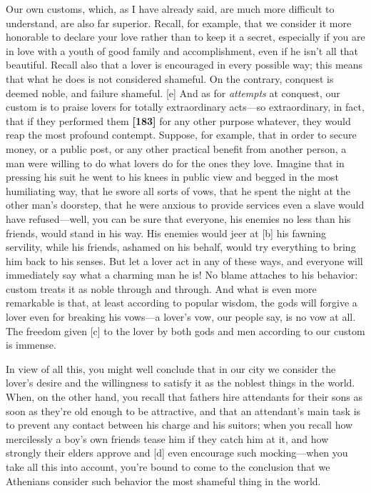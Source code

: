 Our own customs, which, as I have already said, are much more difficult
to understand, are also far superior. Recall, for example, that we
consider it more honorable to declare your love rather than to keep it a
secret, especially if you are in love with a youth of good family and
accomplishment, even if he isn't all that beautiful. Recall also that a
lover is encouraged in every possible way; this means that what he does
is not considered shameful. On the contrary, conquest is deemed noble,
and failure shameful. {[}e{]} And as for {\em attempts} at conquest, our
custom is to praise lovers for totally extraordinary acts---so
extraordinary, in fact, that if they performed them {\bf {[}183{]}} for
any other purpose whatever, they would reap the most profound contempt.
Suppose, for example, that in order to secure money, or a public post,
or any other practical benefit from another person, a man were willing
to do what lovers do for the ones they love. Imagine that in pressing
his suit he went to his knees in public view and begged in the most
humiliating way, that he swore all sorts of vows, that he spent the
night at the other man's doorstep, that he were anxious to provide
services even a slave would have refused---well, you can be sure that
everyone, his enemies no less than his friends, would stand in his way.
His enemies would jeer at {[}b{]} his fawning servility, while his
friends, ashamed on his behalf, would try everything to bring him back
to his senses. But let a lover act in any of these ways, and everyone
will immediately say what a charming man he is! No blame attaches to his
behavior: custom treats it as noble through and through. And what is
even more remarkable is that, at least according to popular wisdom, the
gods will forgive a lover even for breaking his vows---a lover's vow,
our people say, is no vow at all. The freedom given {[}c{]} to the lover
by both gods and men according to our custom is immense.

In view of all this, you might well conclude that in our city we
consider the lover's desire and the willingness to satisfy it as the
noblest things in the world. When, on the other hand, you recall that
fathers hire attendants for their sons as soon as they're old enough to
be attractive, and that an attendant's main task is to prevent any
contact between his charge and his suitors; when you recall how
mercilessly a boy's own friends tease him if they catch him at it, and
how strongly their elders approve and {[}d{]} even encourage such
mocking---when you take all this into account, you're bound to come to
the conclusion that we Athenians consider such behavior the most
shameful thing in the world.

